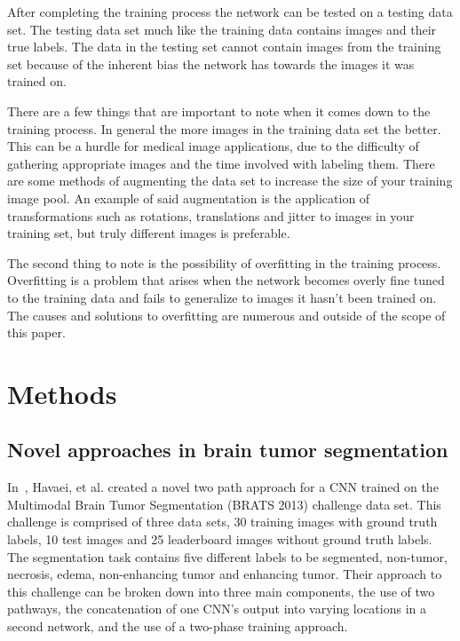 \documentclass{sig-alternate}
\begin{document}
After completing the training process the network can be tested on a testing data set. The testing data set much like the training data contains images and their true labels. The data in the testing set cannot contain images from the training set because of the inherent bias the network has towards the images it was trained on.

There are a few things that are important to note when it comes down to the training process. In general the more images in the training data set the better. This can be a hurdle for medical image applications, due to the difficulty of gathering appropriate images and the time involved with labeling them. There are some methods of augmenting the data set to increase the size of your training image pool. An example of said augmentation is the application of transformations such as rotations, translations and jitter to images in your training set, but truly different images is preferable.

The second thing to note is the possibility of overfitting in the training process. Overfitting is a problem that arises when the network becomes overly fine tuned to the training data and fails to generalize to images it hasn't been trained on. The causes and solutions to overfitting are numerous and outside of the scope of this paper.

\section{Methods}
\label{sec:methods}

\subsection{Novel approaches in brain tumor segmentation}
\label{sec:novelBrainTumorApproach}
In~\cite{Havaei:2017}, Havaei, et al. created a novel two path approach for a CNN trained on the Multimodal Brain Tumor Segmentation (BRATS 2013) challenge data set. This challenge is comprised of three data sets, 30 training images with ground truth labels, 10 test images and 25 leaderboard images without ground truth labels. The segmentation task contains five different labels to be segmented, non-tumor, necrosis, edema, non-enhancing tumor and enhancing tumor. Their approach to this challenge can be broken down into three main components, the use of two pathways, the concatenation of one CNN's output into varying locations in a second network, and the use of a two-phase training approach.
\end{document}
